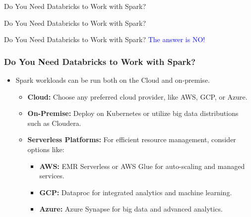 \begin{frame}
\centering %
\vfill %
\Large{Do You Need Databricks to Work with Spark?} %
\vfill %
\end{frame}

\begin{frame}
\centering %
\vfill %
\Large{Do You Need Databricks to Work with Spark?} %
\vspace{1em} %
\vfill %
\end{frame}

\begin{frame}
\centering %
\vfill %
\Large{Do You Need Databricks to Work with Spark?} %
\hspace{1cm} %
\Large{\textcolor{blue}{The answer is NO!}} %
\vfill %
\end{frame}


\begin{frame}
\frametitle{Do You Need Databricks to Work with Spark?}

\begin{itemize}
  \item Spark workloads can be run both on the Cloud and on-premise.
  \begin{itemize}
    \item \textbf{Cloud:} Choose any preferred cloud provider, like AWS, GCP, or Azure.
    \item \textbf{On-Premise:} Deploy on Kubernetes or utilize big data distributions such as Cloudera.
    \item \textbf{Serverless Platforms:} For efficient resource management, consider options like:
    \begin{itemize}
      \item \textbf{AWS:} EMR Serverless or AWS Glue for auto-scaling and managed services.
      \item \textbf{GCP:} Dataproc for integrated analytics and machine learning.
      \item \textbf{Azure:} Azure Synapse for big data and advanced analytics.
    \end{itemize}
  \end{itemize}
\end{itemize}
\end{frame}

